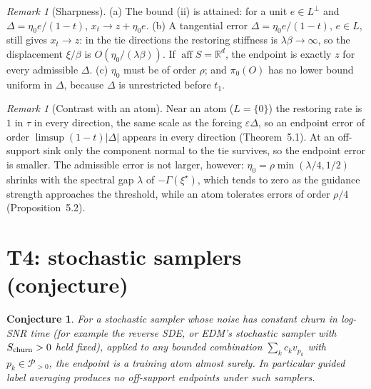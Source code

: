 \documentclass[11pt]{article}
\newtheorem{conjecture}[theorem]{Conjecture}
\theoremstyle{definition}
\theoremstyle{remark}
\newtheorem{remark}[theorem]{Remark}
\newcommand{\R}{\mathbb R}
\newcommand{\Ppos}{\mathcal P_{>0}}
\newcommand{\eps}{\varepsilon}
\DeclareMathOperator{\aff}{aff}
\begin{document}
\begin{remark}[Sharpness]
(a) The bound (ii) is attained: for a unit $e\in L^\perp$ and $\Delta=\eta_0e/(1-t)$, $x_t\to z+\eta_0e$.
(b) A tangential error $\Delta=\eta_0e/(1-t)$, $e\in L$, still gives $x_t\to z$: in the tie directions the
restoring stiffness is $\lambda\beta\to\infty$, so the displacement $\xi/\beta$ is $O(\eta_0/(\lambda\beta))$.
If $\aff S=\R^d$, the endpoint is exactly $z$ for every admissible $\Delta$. (c) $\eta_0$ must be of
order $\rho$; and $\pi_0(O)$ has no lower bound uniform in $\Delta$, because $\Delta$ is unrestricted
before $t_1$.
\end{remark}

\begin{remark}[Contrast with an atom]
Near an atom ($L=\{0\}$) the restoring rate is $1$ in $\tau$ in every direction, the same scale as the
forcing $\eps\Delta$, so an endpoint error of order $\limsup(1-t)|\Delta|$ appears in every direction
(Theorem~5.1). At an off-support sink only the component normal to the tie survives, so the
endpoint error is smaller. The admissible error is not larger, however: $\eta_0=\rho\min(\lambda/4,1/2)$
shrinks with the spectral gap $\lambda$ of $-\Gamma(\xi^\star)$, which tends to zero as the guidance
strength approaches the threshold, while an atom tolerates errors of order $\rho/4$
(Proposition~5.2).
\end{remark}

\section{T4: stochastic samplers (conjecture)}
\label{sec:t4}

\begin{conjecture}\label{conj:sde}
For a stochastic sampler whose noise has constant churn in log-SNR time (for example the reverse
SDE, or EDM's stochastic sampler with $S_{\rm churn}>0$ held fixed), applied to any bounded
combination $\sum_kc_kv_{p_k}$ with $p_k\in\Ppos$, the endpoint is a training atom almost surely.
In particular guided label averaging produces no off-support endpoints under such samplers.
\end{conjecture}
\end{document}
